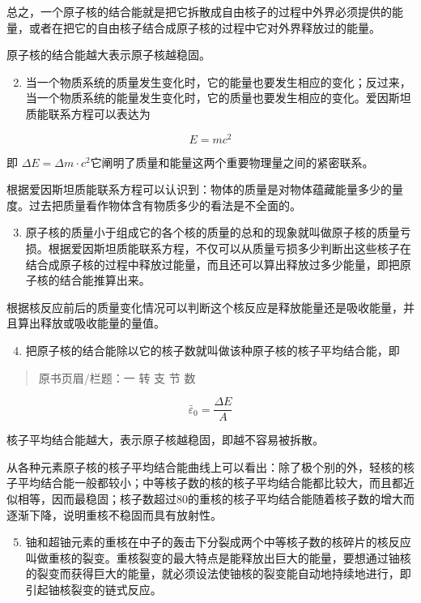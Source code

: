 总之，一个原子核的结合能就是把它拆散成自由核子的过程中外界必须提供的能量，或者在把它的自由核子结合成原子核的过程中它对外界释放过的能量。

原子核的结合能越大表示原子核越稳固。

\begin{enumerate}
\setcounter{enumi}{1}
\item
  当一个物质系统的质量发生变化时，它的能量也要发生相应的变化；反过来，当一个物质系统的能量发生变化时，它的质量也要发生相应的变化。爱因斯坦质能联系方程可以表达为
\end{enumerate}

\[
E = m c ^ {2}
\]

即
\(\Delta E = \Delta m\cdot c^2\)它阐明了质量和能量这两个重要物理量之间的紧密联系。

根据爱因斯坦质能联系方程可以认识到：物体的质量是对物体蕴藏能量多少的量度。过去把质量看作物体含有物质多少的看法是不全面的。

\begin{enumerate}
\setcounter{enumi}{2}
\item
  原子核的质量小于组成它的各个核的质量的总和的现象就叫做原子核的质量亏损。根据爱因斯坦质能联系方程，不仅可以从质量亏损多少判断出这些核子在结合成原子核的过程中释放过能量，而且还可以算出释放过多少能量，即把原子核的结合能推算出来。
\end{enumerate}

根据核反应前后的质量变化情况可以判断这个核反应是释放能量还是吸收能量，并且算出释放或吸收能量的量值。

\begin{enumerate}
\setcounter{enumi}{3}
\item
  把原子核的结合能除以它的核子数就叫做该种原子核的核子平均结合能，即
\end{enumerate}

\begin{quote}
原书页眉/栏题：一 转 支 节 数
\end{quote}

\[
\bar {\varepsilon} _ {0} = \frac {\Delta E}{A}
\]

核子平均结合能越大，表示原子核越稳固，即越不容易被拆散。

从各种元素原子核的核子平均结合能曲线上可以看出：除了极个别的外，轻核的核子平均结合能一般都较小；中等核子数的核的核子平均结合能都比较大，而且都近似相等，因而最稳固；核子数超过80的重核的核子平均结合能随着核子数的增大而逐渐下降，说明重核不稳固而具有放射性。

\begin{enumerate}
\setcounter{enumi}{4}
\item
  铀和超铀元素的重核在中子的轰击下分裂成两个中等核子数的核碎片的核反应叫做重核的裂变。重核裂变的最大特点是能释放出巨大的能量，要想通过铀核的裂变而获得巨大的能量，就必须设法使铀核的裂变能自动地持续地进行，即引起铀核裂变的链式反应。
\end{enumerate}

